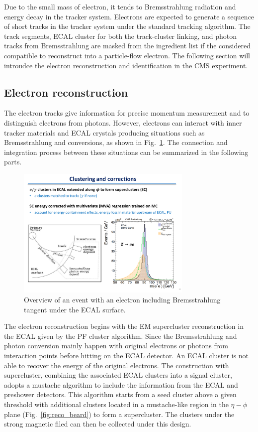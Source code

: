 Due to the small mass of electron, it tends to Bremsstrahlung radiation and energy decay in the tracker system.
Electrons are expected to generate a sequence of short tracks in the tracker system under the standard tracking algorithm.
The track segments, ECAL cluster for both the track-cluster linking, and photon tracks from Bremsstrahlung are masked from the ingredient list if the considered compatible to reconstruct into a particle-flow electron.
The following section will introudce the electron reconstruction and identification in the CMS experiment.

\subsection{Electron reconstruction}
The electron tracks give information for precise momentum measurement and to distinguish electrons from photons.
However, electrons can interact with inner tracker materials and ECAL crystals producing situations such as Bremsstrahlung and conversions, as shown in Fig.~\ref{fig:reco_el_track}.
The connection and integration process between these situations can be summarized in the following parts.

\begin{figure}\centering
    \includegraphics[width=0.75\textwidth]{figure/reco_el_track.pdf}
    \caption
    {
    Overview of an event with an electron including Bremsstrahlung tangent under the ECAL surface.
    }
    \label{fig:reco_el_track}
\end{figure}

The electron reconstruction begins with the EM supercluster reconstruction in the ECAL given by the PF cluster algorithm.
Since the Bremsstrahlung and photon conversion mainly happen with original electrons or photons from interaction points before hitting on the ECAL detector.
An ECAL cluster is not able to recover the energy of the original electrons.
The construction with supercluster, combining the associated ECAL clusters into a signal cluster, adopts a mustache algorithm to include the information from the ECAL and preshower detectors.
This algorithm starts from a seed cluster above a given threshold with additional clusters located in a mustache-like region in the $\eta-\phi$ plane (Fig.~\ref{fig:reco_beard}) to form a supercluster.
The clusters under the strong magnetic filed can then be collected under this design.

